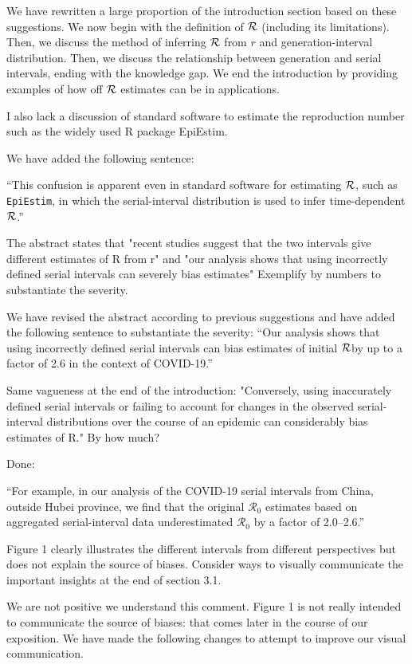 \documentclass[12pt]{article}
\newcommand{\RR}{\ensuremath{{\cal R}}}
\newcommand{\Ro}{\ensuremath{{\mathcal R}_{0}}\xspace}
\newcommand{\revtext}{\textsf}
\begin{document}
We have rewritten a large proportion of the introduction section based on these suggestions.
We now begin with the definition of $\RR$ (including its limitations). 
Then, we discuss the method of inferring $\RR$ from $r$ and generation-interval distribution. 
Then, we discuss the relationship between generation and serial intervals, ending with the knowledge gap.
We end the introduction by providing examples of how off $\RR$ estimates can be in applications.

\revtext{I also lack a discussion of standard software to estimate the reproduction number such as the widely used R package EpiEstim.}

We have added the following sentence:

``This confusion is apparent even in standard software for estimating \RR, such as \texttt{EpiEstim}, in which the serial-interval distribution is used to infer time-dependent \RR \citep{thompson2019improved}.''

\revtext{The abstract states that "recent studies suggest that the two intervals give different estimates of R from r" and "our analysis shows that using incorrectly defined serial intervals can severely bias estimates" Exemplify by numbers to substantiate the severity.}

We have revised the abstract according to previous suggestions and have added the following sentence to substantiate the severity: ``Our analysis shows that using incorrectly defined serial intervals can bias estimates of initial \RR by up to a factor of 2.6 in the context of COVID-19.''

\revtext{Same vagueness at the end of the introduction: "Conversely, using inaccurately defined serial intervals or failing to account for changes in the observed serial-interval distributions over the course of an epidemic can considerably bias estimates of R." By how much?}

Done:

``For example, in our analysis of the COVID-19 serial intervals from China, outside Hubei province, we find that the original \Ro estimates based on aggregated serial-interval data underestimated \Ro by a factor of 2.0--2.6.''

\revtext{Figure 1 clearly illustrates the different intervals from different perspectives but does not explain the source of biases. Consider ways to visually communicate the important insights at the end of section 3.1.}

We are not positive we understand this comment. Figure 1 is not really intended to communicate the source of biases: that comes later in the course of our exposition. We have made the following changes to attempt to improve our visual communication.
\end{document}
